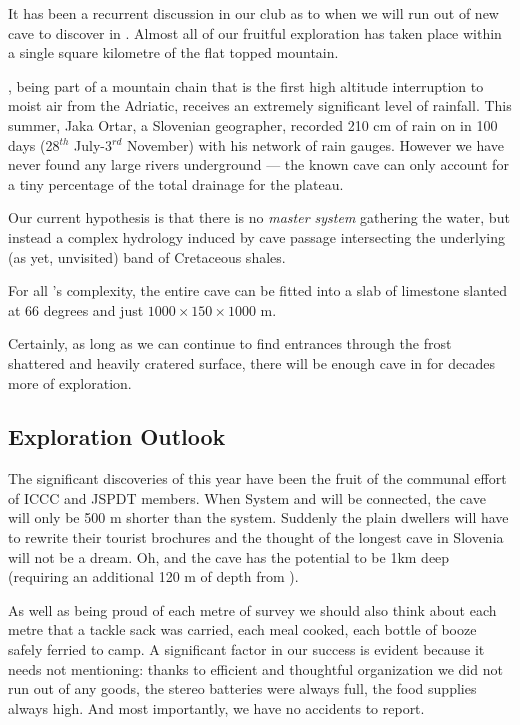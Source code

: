 It has been a recurrent discussion in our club as to when we will run
out of new cave to discover in . Almost all of our fruitful
exploration has taken place within a single square kilometre of the flat
topped mountain.

, being part of a mountain chain that is the first high altitude
interruption to moist air from the Adriatic, receives an extremely
significant level of rainfall. This summer, Jaka Ortar, a Slovenian
geographer, recorded 210 cm of rain on  in 100 days (28\(^{th}\)
July-3\(^{rd}\) November) with his network of rain gauges. However we
have never found any large rivers underground --- the known cave can
only account for a tiny percentage of the total drainage for the
plateau.

Our current hypothesis is that there is no \textit{master system}
gathering the water, but instead a complex hydrology induced by cave
passage intersecting the underlying (as yet, unvisited) band of
Cretaceous shales.

For all 's complexity, the entire cave can be fitted
into a slab of limestone slanted at 66 degrees and just
\(1000\times150\times1000\) m.

Certainly, as long as we can continue to find entrances through the
frost shattered and heavily cratered surface, there will be enough cave
in  for decades more of exploration.


\subsection{Exploration Outlook}

The significant discoveries of this year have been the fruit of the communal effort of ICCC and JSPDT members. When System  and  will be connected, the cave will only be 500 m shorter than the 
system. Suddenly the plain dwellers will have to rewrite their tourist brochures and the thought of the longest cave in Slovenia
will not be a dream. Oh, and the cave has the potential to be 1km deep (requiring an additional 120 m of depth from ).


As well as being proud of each metre of survey we should also think about each metre that a tackle sack was carried, each meal cooked, each bottle of booze safely ferried to camp. A significant factor in our success is evident because it needs not mentioning: thanks to efficient and thoughtful organization we did not run out of any goods, the stereo batteries were always full, the food supplies always high. And most importantly, we have no accidents to report.
